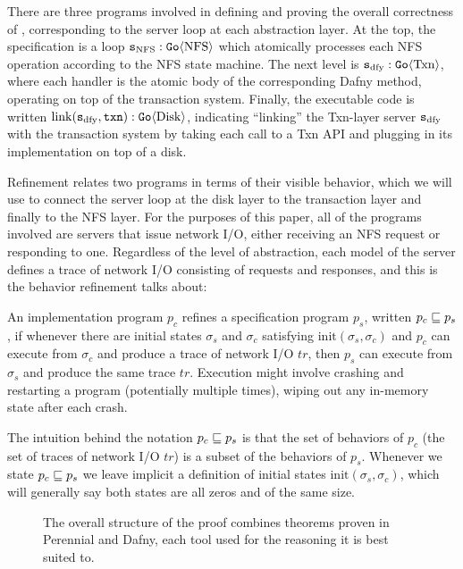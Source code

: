 There are three programs involved in defining and proving the overall
correctness of \sys, corresponding to the server loop at each abstraction layer.
At the top, the specification is a loop $\texttt{s}_{\mathrm{NFS}} : \mathtt{Go}\langle \mathrm{NFS} \rangle$ which
atomically processes each NFS operation according to the NFS state machine. The
next level is $\texttt{s}_{\mathrm{dfy}} : \mathtt{Go}\langle \mathrm{Txn} \rangle$, where each handler is the atomic body of the
corresponding Dafny method, operating on top of the transaction system. Finally,
the executable code is written
$\mathrm{link}(\texttt{s}_{\mathrm{dfy}}, \texttt{txn}) : \mathtt{Go}\langle \mathrm{Disk} \rangle$, indicating ``linking'' the
Txn-layer server $\texttt{s}_{\mathrm{dfy}}$ with the transaction system by taking each call to a
Txn API and plugging in its implementation on top of a disk.

Refinement relates two programs in terms of their visible behavior, which we
will use to connect the server loop at the disk layer to the transaction layer
and finally to the NFS layer. For the purposes of this paper, all of the
programs involved are servers that issue network I/O, either receiving an NFS
request or responding to one. Regardless of the level of abstraction, each model
of the server defines a trace of network I/O consisting of requests and
responses, and this is the behavior refinement talks about:

\begin{definition}[Refinement]
  An implementation program $p_{c}$ refines a specification program $p_{s}$,
written $p_{c} \sqsubseteq p_{s}$, if whenever there are initial states
$\sigma_{s}$ and $\sigma_{c}$ satisfying $\mathrm{init}(\sigma_{s}, \sigma_{c})$
and $p_{c}$ can execute from $\sigma_{c}$ and produce a trace of network I/O
$tr$, then $p_{s}$ can execute from $\sigma_{s}$ and produce the same trace
$tr$.  Execution might involve crashing and restarting a program (potentially
multiple times), wiping out any in-memory state after each crash.
  \label{def:refinement}
\end{definition}

The intuition behind the notation $p_{c} \sqsubseteq p_{s}$ is that the set of
behaviors of $p_{c}$ (the set of traces of network I/O $tr$) is a subset of the
behaviors of $p_{s}$. Whenever we state $p_{c} \sqsubseteq p_{s}$ we leave implicit
a definition of initial states $\mathrm{init}(\sigma_{s}, \sigma_{c})$, which
will generally say both states are all zeros and of the same size.

\begin{figure}[ht]
  \center
  
  \caption{The overall structure of the proof combines theorems proven in Perennial
    and Dafny, each tool used for the reasoning it is best suited to.}
  \label{fig:proof-overview}
\end{figure}

